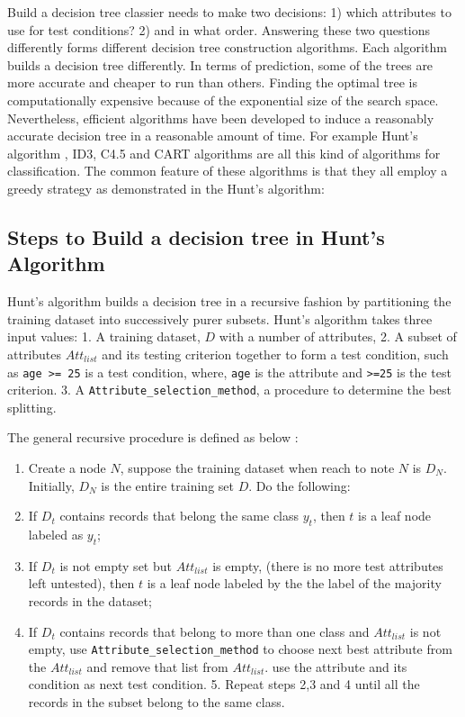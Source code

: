 \documentclass[
]{book}
\providecommand{\tightlist}{%
  \setlength{\itemsep}{0pt}\setlength{\parskip}{0pt}}
\begin{document}
Build a decision tree classier needs to make two decisions: 1) which attributes to use for test conditions? 2) and in what order. Answering these two questions differently forms different decision tree construction algorithms. Each algorithm builds a decision tree differently. In terms of prediction, some of the trees are more accurate and cheaper to run than others. Finding the optimal tree is computationally expensive because of the exponential size of the search space. Nevertheless, efficient algorithms have been developed to induce a reasonably accurate decision tree in a reasonable amount of time. For example Hunt's algorithm , ID3, C4.5 and CART algorithms are all this kind of algorithms for classification. The common feature of these algorithms is that they all employ a greedy strategy as demonstrated in the Hunt's algorithm:

\hypertarget{steps-to-build-a-decision-tree-in-hunts-algorithm}{%
\subsection{Steps to Build a decision tree in Hunt's Algorithm}\label{steps-to-build-a-decision-tree-in-hunts-algorithm}}

Hunt's algorithm builds a decision tree in a recursive fashion by partitioning the training dataset into successively purer subsets. Hunt's algorithm takes three input values:
1. A training dataset, \(D\) with a number of attributes,
2. A subset of attributes \(Att_{list}\) and its testing criterion together to form a test condition, such as \texttt{age\ \textgreater{}=\ 25} is a test condition, where, \texttt{age} is the attribute and \texttt{\textgreater{}=25} is the test criterion.
3. A \texttt{Attribute\_selection\_method}, a procedure to determine the best splitting.

The general recursive procedure is defined as below \citep{Tan2005}:

\begin{enumerate}
\def\labelenumi{\arabic{enumi}.}
\tightlist
\item
  Create a node \(N\), suppose the training dataset when reach to note \(N\) is \(D_{N}\). Initially, \(D_{N}\) is the entire training set \(D\). Do the following:
\item
  If \(D_{t}\) contains records that belong the same class \(y_{t}\), then \(t\) is a leaf node labeled as \(y_{t}\);
\item
  If \(D_{t}\) is not empty set but \(Att_{list}\) is empty, (there is no more test attributes left untested), then \(t\) is a leaf node labeled by the the label of the majority records in the dataset;
\item
  If \(D_{t}\) contains records that belong to more than one class and \(Att_{list}\) is not empty, use \texttt{Attribute\_selection\_method} to choose next best attribute from the \(Att_{list}\) and remove that list from \(Att_{list}\). use the attribute and its condition as next test condition. 5. Repeat steps 2,3 and 4 until all the records in the subset belong to the same class.
\end{enumerate}
\end{document}
